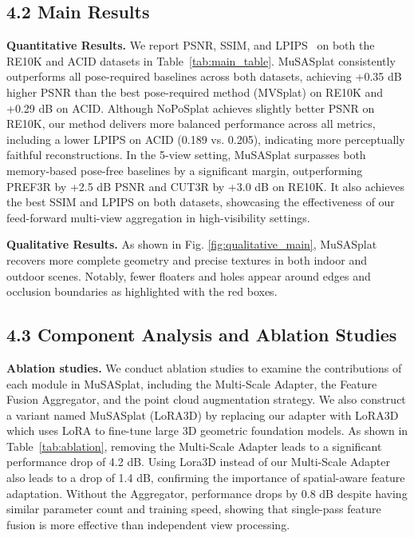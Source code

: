 \documentclass[letterpaper]{article} %
\begin{document}
\subsection{4.2 Main Results}
\label{subsec:exp_results}


\noindent\textbf{Quantitative Results.}  
We report PSNR, SSIM, and LPIPS~\cite{zhang2018unreasonable} on both the RE10K and ACID datasets in Table~\ref{tab:main_table}.
MuSASplat consistently outperforms all pose-required baselines across both datasets, achieving +0.35 dB higher PSNR than the best pose-required method (MVSplat) on RE10K and +0.29 dB on ACID.
Although NoPoSplat achieves slightly better PSNR on RE10K, our method delivers more balanced performance across all metrics, including a lower LPIPS on ACID (0.189 vs. 0.205), indicating more perceptually faithful reconstructions.
In the 5-view setting, MuSASplat surpasses both memory-based pose-free baselines by a significant margin, outperforming PREF3R by +2.5 dB PSNR and CUT3R by +3.0 dB on RE10K.
It also achieves the best SSIM and LPIPS on both datasets, showcasing the effectiveness of our feed-forward multi-view aggregation in high-visibility settings.

\noindent\textbf{Qualitative Results.}  
As shown in Fig. \ref{fig:qualitative_main}, MuSASplat recovers more complete geometry and precise textures in both indoor and outdoor scenes.  
Notably, fewer floaters and holes appear around edges and occlusion boundaries as highlighted with the red boxes.


\subsection{4.3 Component Analysis and Ablation Studies}
\label{subsec:abl_study}

\noindent\textbf{Ablation studies.}  
We conduct ablation studies to examine the contributions of each module in MuSASplat, including the Multi-Scale Adapter, the Feature Fusion Aggregator, and the point cloud augmentation strategy. We also construct a variant named MuSASplat (LoRA3D) by replacing our adapter with LoRA3D~\cite{hu2022lora} which uses LoRA to fine-tune large 3D geometric foundation models.
As shown in Table~\ref{tab:ablation}, removing the Multi-Scale Adapter leads to a significant performance drop of 4.2 dB. Using Lora3D instead of our Multi-Scale Adapter also leads to a drop of 1.4 dB, confirming the importance of spatial-aware feature adaptation.
Without the Aggregator, performance drops by 0.8 dB despite having similar parameter count and training speed, showing that single-pass feature fusion is more effective than independent view processing.
\end{document}
